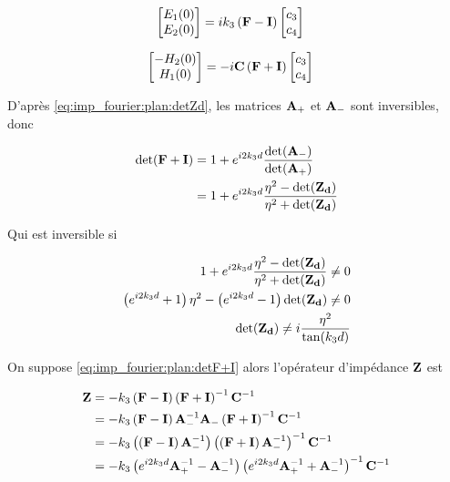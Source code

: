 \begin{align}
    \begin{bmatrix}
        E_1(0)\\
        E_2(0)\\
    \end{bmatrix}
    &=ik_3\left(\mathbf{F} - \mathbf{I} \right)
    \begin{bmatrix}
        c_3 \\
        c_4
    \end{bmatrix}
\end{align}

\begin{align}
    \begin{bmatrix}
        -H_2(0)\\
        H_1(0)\\
    \end{bmatrix}
    &=-i\mathbf{C} \left(  \mathbf{F} + \mathbf{I}  \right)
    \begin{bmatrix}
            c_3 \\
            c_4
    \end{bmatrix}
\end{align}

D'après \eqref{eq:imp_fourier:plan:detZd}, les matrices $\mathbf{A}_+$ et $\mathbf{A}_-$ sont inversibles, donc

\begin{align}
    \det(\mathbf{F} + \mathbf{I}) &= 1 + e^{i2k_3d}\dfrac{\det(\mathbf{A}_-)}{\det(\mathbf{A}_+)}
    \\
    &= 1 + e^{i2k_3d}\dfrac{\eta^2 - \det(\mathbf{Z_d})}{\eta^2 + \det(\mathbf{Z_d})}
\end{align}

Qui est inversible si

\begin{align}
1 + e^{i2k_3d}\dfrac{\eta^2 - \det(\mathbf{Z_d})}{\eta^2 + \det(\mathbf{Z_d})} \not = 0 
\\
\left(e^{i2k_3d} + 1\right)\eta^2 - \left(e^{i2k_3d} - 1 \right)\det(\mathbf{Z_d}) \not = 0 
\\
\det(\mathbf{Z_d}) \not =  i\dfrac{\eta^2}{\tan(k_3d)}
\label{eq:imp_fourier:plan:detF+I}
\end{align}

On suppose \eqref{eq:imp_fourier:plan:detF+I} alors l'opérateur d'impédance $\mathbf{Z}$ est

\begin{align}
    \mathbf{Z}
    &=-k_3\left(\mathbf{F} - \mathbf{I} \right)\left(\mathbf{F}+ \mathbf{I} \right)^{-1}\mathbf{C}^{-1}
    \\
    &=-k_3\left(\mathbf{F} - \mathbf{I} \right)\mathbf{A}_-^{-1}\mathbf{A}_-\left(\mathbf{F}+ \mathbf{I} \right)^{-1}\mathbf{C}^{-1}
    \\
    &=-k_3\left(\left(\mathbf{F} - \mathbf{I} \right)\mathbf{A}_-^{-1}\right)\left(\left(\mathbf{F}+ \mathbf{I} \right)\mathbf{A}_-^{-1}\right)^{-1}\mathbf{C}^{-1}
    \\
    &=-k_3\left( e^{i2 k_3 d} \mathbf{A}_+^{-1} -  \mathbf{A}_-^{-1} \right)
    \left( e^{i2 k_3 d} \mathbf{A}_+^{-1} + \mathbf{A}_-^{-1} \right)^{-1}\mathbf{C}^{-1}
\end{align}


